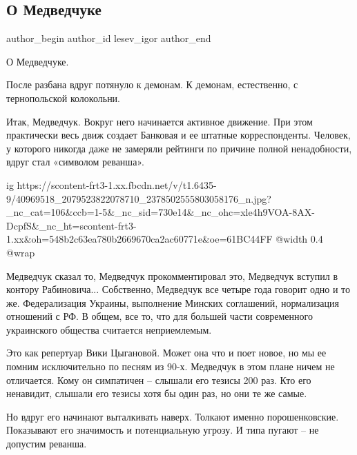  
 
 
 
 
 
\subsection{О Медведчуке}
\label{sec:05_09_2018.fb.lesev_igor.1.o_medvedchuke}
 
\ifcmt
 author_begin
   author_id lesev_igor
 author_end
\fi

О Медведчуке.

После разбана вдруг потянуло к демонам. К демонам, естественно, с тернопольской
колокольни.

Итак, Медведчук. Вокруг него начинается активное движение. При этом практически
весь движ создает Банковая и ее штатные корреспонденты. Человек, у которого
никогда даже не замеряли рейтинги по причине полной ненадобности, вдруг стал
«символом реванша».

\ifcmt
  ig https://scontent-frt3-1.xx.fbcdn.net/v/t1.6435-9/40969518_2079523822078710_2378502555803058176_n.jpg?_nc_cat=106&ccb=1-5&_nc_sid=730e14&_nc_ohc=xle4h9VOA-8AX-DcpfS&_nc_ht=scontent-frt3-1.xx&oh=548b2c63ea780b2669670ca2ac60771e&oe=61BC44FF
  @width 0.4
  @wrap 
\fi

Медведчук сказал то, Медведчук прокомментировал это, Медведчук вступил в
контору Рабиновича... Собственно, Медведчук все четыре года говорит одно и то
же. Федерализация Украины, выполнение Минских соглашений, нормализация
отношений с РФ. В общем, все то, что для большей части современного украинского
общества считается неприемлемым.

Это как репертуар Вики Цыгановой. Может она что и поет новое, но мы ее помним
исключительно по песням из 90-х. Медведчук в этом плане ничем не отличается.
Кому он симпатичен – слышали его тезисы 200 раз. Кто его ненавидит, слышали его
тезисы хотя бы один раз, но они те же самые.

Но вдруг его начинают выталкивать наверх. Толкают именно порошенковские.
Показывают его значимость и потенциальную угрозу. И типа пугают – не допустим
реванша.

